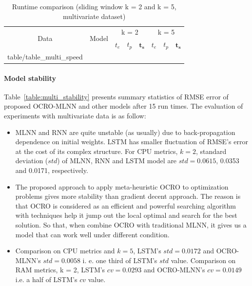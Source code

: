 \documentclass[review,3p,authoryear]{elsarticle}
\makeatletter
\newcommand\primitiveinput[1]
		{\@@input #1 }
\makeatother
\begin{document}
{%
\begin{table}[!h]
	\caption{Runtime comparison (sliding window k = 2 and k = 5, multivariate dataset)}
	\label{table:multi_speed}
	\centering
	\begin{adjustbox}{width=0.7\textwidth}
		\begin{tabular}{| c | c | c | c | c | c | c | c |}%
			\hline
			\multirow{2}{*}{Data} & \multirow{2}{*}{Model} & \multicolumn{3}{c|}{k = 2} & \multicolumn{3}{c|}{ k = 5 } \\ \cline{3-8}
   				& & $t_e$ & $t_p$ & $\boldsymbol{t_s}$ & $t_e$ & $t_p$ & $\boldsymbol{t_s}$  \\ [0.5ex] \hline
			\primitiveinput{table/table_multi_speed}
			\hline
		\end{tabular}
	\end{adjustbox}
\end{table}


\paragraph{\textbf{Model stability}} 
Table~\ref{table:multi_stability} presents summary statistics of RMSE error of proposed OCRO-MLNN and other models after 15 run times. The evaluation of experiments with multivariate data is as follow:
\begin{itemize}
	\item MLNN and RNN are quite unstable (as usually) due to back-propagation dependence on initial weights. LSTM has smaller fluctuation of RMSE's error at the cost of its complex structure. 
	For CPU metrics, $k = 2$, standard deviation ($std$) of MLNN, RNN and LSTM model are $std = 0.0615$, 0.0353 and 0.0171, respectively. 
	
	\item The proposed approach to apply meta-heuristic OCRO to optimization problems gives more stability than gradient decent approach. The reason is that OCRO is considered as an efficient and powerful searching algorithm with techniques help it jump out the local optimal and search for the best solution. So that, when combine OCRO with traditional MLNN, it gives us a model that can work well under different condition. 
	
	\item Comparison on CPU metrics and $k = 5$, 
	LSTM's $std = 0.0172$ and OCRO-MLNN's $std= 0.0058$ i. e. one third of LSTM's $std$ value. 
	Comparison on RAM metrics, k = 2, 
	LSTM's $cv = 0.0293$ and OCRO-MLNN's $cv=0.0149$ i.e. a half of LSTM's $cv$ value. 
\end{itemize}

}
\end{document}

